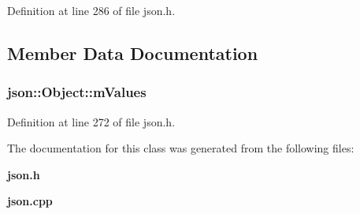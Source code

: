 Definition at line 286 of file json.\+h.



\subsection{Member Data Documentation}
\subsubsection[{m\+Values}]{ json\+::\+Object\+::m\+Values\hspace{0.3cm}{\ttfamily [protected]}}\label{classjson_1_1_object_abd590583e6aec8e4e3635d38f809c60b}


Definition at line 272 of file json.\+h.



The documentation for this class was generated from the following files\+:\begin{DoxyCompactItemize}
\item 
{\bf json.\+h}\item 
{\bf json.\+cpp}\end{DoxyCompactItemize}
